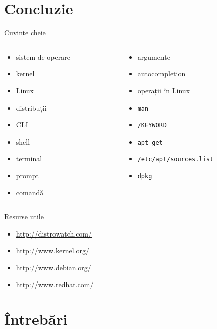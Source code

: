 \documentclass{curs}
\begin{document}
\section{Concluzie}

\begin{frame}{Cuvinte cheie}
  \begin{columns}
    \begin{column}[l]{0.5\textwidth}
      \begin{itemize}
        \item sistem de operare
        \item kernel
        \item Linux
        \item distribuții
        \item CLI
        \item shell
        \item terminal
        \item prompt
        \item comandă
      \end{itemize}
    \end{column}
    \begin{column}[l]{0.5\textwidth}
      \begin{itemize}
        \item argumente
        \item autocompletion
        \item operații în Linux
        \item \texttt{man}
        \item \texttt{/KEYWORD}
        \item \texttt{apt-get}
        \item \texttt{/etc/apt/sources.list}
        \item \texttt{dpkg}
      \end{itemize}
    \end{column}
  \end{columns}
\end{frame}

\begin{frame}{Resurse utile}
  \begin{itemize}
    \item \url{http://distrowatch.com/}
    \item \url{http://www.kernel.org/}
    \item \url{http://www.debian.org/}
    \item \url{http://www.redhat.com/}
  \end{itemize}
\end{frame}


\section{Întrebări}
\end{document}
